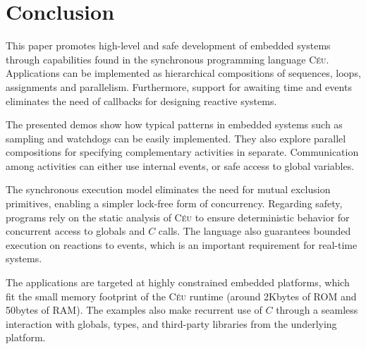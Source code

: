 \documentclass{sig-alternate}
\newcommand{\2}{\;\;}
\newcommand{\5}{\;\;\;\;\;}
\newcommand{\CEU}{\textsc{C\'{e}u}}
\begin{document}
\section{Conclusion}
\label{sec:conclusion}

This paper promotes high-level and safe development of embedded systems through 
capabilities found in the synchronous programming language \CEU{}.
Applications can be implemented as hierarchical compositions of sequences, 
loops, assignments and parallelism.
Furthermore, support for awaiting time and events eliminates the need of 
callbacks for designing reactive systems.

The presented demos show how typical patterns in embedded systems such as 
sampling and watchdogs can be easily implemented.
They also explore parallel compositions for specifying complementary activities 
in separate.
Communication among activities can either use internal events, or safe access 
to global variables.

The synchronous execution model eliminates the need for mutual exclusion 
primitives, enabling a simpler lock-free form of concurrency.
Regarding safety, programs rely on the static analysis of \CEU{} to ensure 
deterministic behavior for concurrent access to globals and $C$ calls.
The language also guarantees bounded execution on reactions to events, which is 
an important requirement for real-time systems.

The applications are targeted at highly constrained embedded platforms, which 
fit the small memory footprint of the \CEU{} runtime (around 2Kbytes of ROM and 
50bytes of RAM).
The examples also make recurrent use of $C$ through a seamless interaction with 
globals, types, and third-party libraries from the underlying platform.



\end{document}
